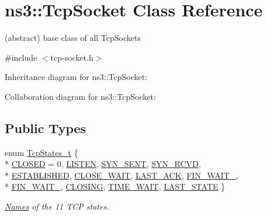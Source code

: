 \hypertarget{classns3_1_1TcpSocket}{}\section{ns3\+:\+:Tcp\+Socket Class Reference}
\label{classns3_1_1TcpSocket}


(abstract) base class of all Tcp\+Sockets  




{\ttfamily \#include $<$tcp-\/socket.\+h$>$}



Inheritance diagram for ns3\+:\+:Tcp\+Socket\+:


Collaboration diagram for ns3\+:\+:Tcp\+Socket\+:
\subsection*{Public Types}
\begin{DoxyCompactItemize}
\item 
enum \hyperlink{group__tcp_ga3929cdb47bdf159657fa24054aa5ca03}{Tcp\+States\+\_\+t} \{ \\*
\hyperlink{group__tcp_gga3929cdb47bdf159657fa24054aa5ca03a9ce7d71243551037394c5e691627e66f}{C\+L\+O\+S\+ED} = 0, 
\hyperlink{group__tcp_gga3929cdb47bdf159657fa24054aa5ca03a581d49096b20553996c0ef8aaf2712f8}{L\+I\+S\+T\+EN}, 
\hyperlink{group__tcp_gga3929cdb47bdf159657fa24054aa5ca03a93f185d16390df3819d44eca0c349cc3}{S\+Y\+N\+\_\+\+S\+E\+NT}, 
\hyperlink{group__tcp_gga3929cdb47bdf159657fa24054aa5ca03abdb50eab9f592a17a412a62deddde11a}{S\+Y\+N\+\_\+\+R\+C\+VD}, 
\\*
\hyperlink{group__tcp_gga3929cdb47bdf159657fa24054aa5ca03a1826ad465d372319d1db905886de3743}{E\+S\+T\+A\+B\+L\+I\+S\+H\+ED}, 
\hyperlink{group__tcp_gga3929cdb47bdf159657fa24054aa5ca03a812907d056aeb79789f671d657f076a3}{C\+L\+O\+S\+E\+\_\+\+W\+A\+IT}, 
\hyperlink{group__tcp_gga3929cdb47bdf159657fa24054aa5ca03ac7d6d4c1e935aee5aced83a7777cbd6c}{L\+A\+S\+T\+\_\+\+A\+CK}, 
\hyperlink{group__tcp_gga3929cdb47bdf159657fa24054aa5ca03a9f54edeb0f23302ae1c36d433b587b02}{F\+I\+N\+\_\+\+W\+A\+I\+T\+\_}, 
\\*
\hyperlink{group__tcp_gga3929cdb47bdf159657fa24054aa5ca03a21589580da204f50bec2361f7d39643f}{F\+I\+N\+\_\+\+W\+A\+I\+T\+\_}, 
\hyperlink{group__tcp_gga3929cdb47bdf159657fa24054aa5ca03aed7b7568d5e6519d8ce40712445b533d}{C\+L\+O\+S\+I\+NG}, 
\hyperlink{group__tcp_gga3929cdb47bdf159657fa24054aa5ca03aabab2f97744253d961a122fa320db73b}{T\+I\+M\+E\+\_\+\+W\+A\+IT}, 
\hyperlink{group__tcp_gga3929cdb47bdf159657fa24054aa5ca03a684440ec60e09c0ae73fc3758acaae4e}{L\+A\+S\+T\+\_\+\+S\+T\+A\+TE}
 \}\begin{DoxyCompactList}\small\item\em \hyperlink{classns3_1_1Names}{Names} of the 11 T\+CP states. \end{DoxyCompactList}
\end{DoxyCompactItemize}
